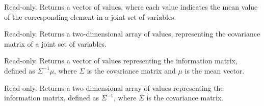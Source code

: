 

Read-only.  Returns a vector of values, where each value indicates the mean value of the corresponding element in a joint set of variables.


Read-only.  Returns a two-dimensional array of values, representing the covariance matrix of a joint set of variables.


Read-only.  Returns a vector of values representing the information matrix, defined as $\Sigma^{-1}\mu$, where $\Sigma$ is the covariance matrix and $\mu$ is the mean vector.


Read-only.  Returns a two-dimensional array of values representing the information matrix, defined as $\Sigma^{-1}$, where $\Sigma$ is the covariance matrix.





